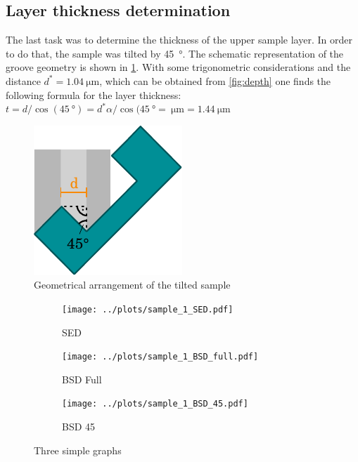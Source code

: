 \subsection{Layer thickness determination}
The last task was to determine the thickness of the upper
sample layer.
In order to do that, the sample was tilted by \qty{45}{\degree}.
The schematic representation of the groove geometry is shown
in \cref{fig:layer}.
With some trigonometric considerations and the distance
$d^*=\qty{1.04}{\micro\meter}$, which can be obtained from \cref{fig:depth}
one finds the following formula for the layer thickness:
$t = d / \cos(\qty{45}{\degree}) = d^* \alpha / \cos(\qty{45}{\degree}
	=\qty{}{\micro\meter} = \qty{1.44}{\micro\meter}$

\begin{figure}
	\centering
	\includegraphics{../assets/angle.pdf}
	\caption{Geometrical arrangement of the tilted sample}
	\label{fig:layer}
\end{figure}

\begin{figure}[t!]
	\centering
	\begin{subfigure}{0.7\linewidth}
		\centering
		\texttt{[image: ../plots/sample\_1\_SED.pdf]}
		\caption{SED}
		\label{subfig:sample_0_sed}
	\end{subfigure}
	\begin{subfigure}{0.7\linewidth}
		\centering
		\texttt{[image: ../plots/sample\_1\_BSD\_full.pdf]}
		\caption{BSD Full}
		\label{subfig:sample_0_bsd_full}
	\end{subfigure}
	\begin{subfigure}{0.7\linewidth}
		\centering
		\texttt{[image: ../plots/sample\_1\_BSD\_45.pdf]}
		\caption{BSD 45}
		\label{subfig:sample_0_bsd_45}
	\end{subfigure}
	\caption{Three simple graphs}
	\label{fig:sample_0}
\end{figure}

